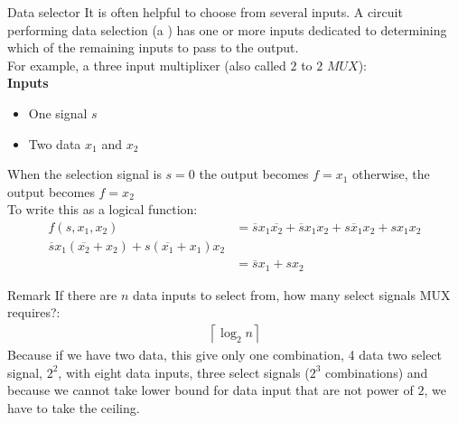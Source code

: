 \begin{parag}{Data selector}
    It is often helpful to choose  from several inputs. A circuit performing data selection (a ) has one or more  inputs dedicated to determining which of the remaining inputs to pass to the output. \\
    For example, a three input multiplixer (also called $2$ to $2$ $MUX$):\\
    \textbf{Inputs}
    \begin{itemize}
        \item One  signal $s$
        \item Two data  $x_1$ and $x_2$
    \end{itemize}
    When the selection signal is $s = 0$ the output becomes $f = x_1$ otherwise, the output becomes $f = x_2$\\
    To write this as a logical function:
\begin{align*}
    f(s, x_1, x_2) &= \overline{s}x_1 \overline{x_2} + \overline{s}x_1x_2 + s \overline{x}_1x_2 + sx_1x_2 \\
    \overline{s}x_1 ( \overline{x_2} + x_2) + s( \overline{x_1} + x_1)x_2 \\
    &= \overline{s}x_1 + sx_2
\end{align*}

\begin{subparag}{Remark}
  If there are $n$ data inputs to select from, how many select signals MUX requires?:
  \begin{align*}
      \left\lceil \log_2 n \right\rceil
  \end{align*}
  Because if we have two data, this give only one combination, 4 data two select signal, $2^2$, with eight data inputs, three select signals ($2^3$ combinations) and because we cannot take lower bound for data input that are not power of $2$, we have to take the ceiling.
  
\end{subparag}

\end{parag}




